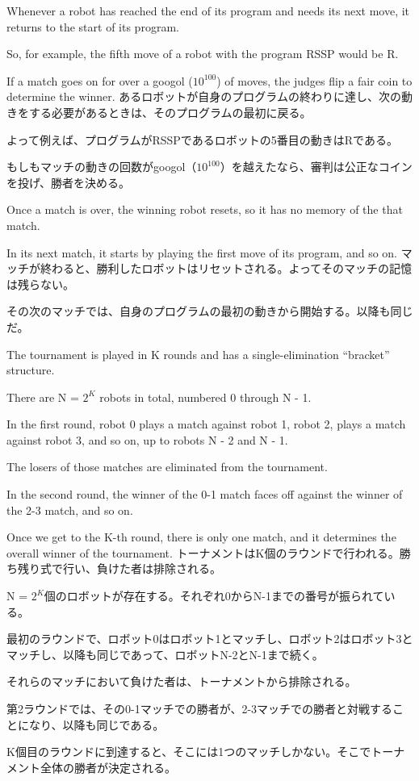 \documentclass[uplatex,dvipdfmx]{jsarticle} \usepackage{amsmath,amssymb,bm}
\begin{document}
\vspace{\baselineskip}
\begin{paracol}{2}
Whenever a robot has reached the end of its program and needs its next move, it returns to the start of its program.

So, for example, the fifth move of a robot with the program RSSP would be R.

If a match goes on for over a googol ($10^{100}$) of moves, the judges flip a fair coin to determine the winner.
\switchcolumn
あるロボットが自身のプログラムの終わりに達し、次の動きをする必要があるときは、そのプログラムの最初に戻る。

よって例えば、プログラムがRSSPであるロボットの5番目の動きはRである。

もしもマッチの動きの回数がgoogol（$10^{100}$）を越えたなら、審判は公正なコインを投げ、勝者を決める。
\end{paracol}
\vspace{\baselineskip}
\begin{paracol}{2}
Once a match is over, the winning robot resets, so it has no memory of the that match.

In its next match, it starts by playing the first move of its program, and so on.
\switchcolumn
マッチが終わると、勝利したロボットはリセットされる。よってそのマッチの記憶は残らない。

その次のマッチでは、自身のプログラムの最初の動きから開始する。以降も同じだ。
\end{paracol}
\vspace{\baselineskip}
\begin{paracol}{2}
The tournament is played in K rounds and has a single-elimination ``bracket'' structure.

There are N = $2^K$ robots in total, numbered 0 through N - 1.

In the first round, robot 0 plays a match against robot 1, robot 2, plays a match against robot 3, and so on, up to robots N - 2 and N - 1.

The losers of those matches are eliminated from the tournament.

In the second round, the winner of the 0-1 match faces off against the winner of the 2-3 match, and so on.

Once we get to the K-th round, there is only one match, and it determines the overall winner of the tournament.
\switchcolumn
トーナメントはK個のラウンドで行われる。勝ち残り式で行い、負けた者は排除される。

N = $2^K$個のロボットが存在する。それぞれ0からN-1までの番号が振られている。

最初のラウンドで、ロボット0はロボット1とマッチし、ロボット2はロボット3とマッチし、以降も同じであって、ロボットN-2とN-1まで続く。

それらのマッチにおいて負けた者は、トーナメントから排除される。

第2ラウンドでは、その0-1マッチでの勝者が、2-3マッチでの勝者と対戦することになり、以降も同じである。

K個目のラウンドに到達すると、そこには1つのマッチしかない。そこでトーナメント全体の勝者が決定される。
\end{paracol}
\end{document}
